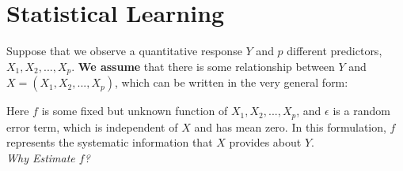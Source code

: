 \documentclass[12pt,a4paper]{article}
\begin{document}
\section{Statistical Learning}
Suppose that we observe a quantitative response $Y$ and $p$ different predictors, $X_{1},X_{2},...,X_{p}$. \textbf{We assume} that there is some relationship between $Y$ and $X =(X_{1},X_{2},...,X_{p})$, which can be written in the very general form:
\begin{center}
\end{center}
Here $f$ is some fixed but unknown function of $X_{1},X_{2},...,X_{p}$, and $\epsilon$ is a random error term, which is independent of $X$ and has mean zero. In this formulation, $f$ represents the systematic information that $X$ provides about $Y$.\\
\newline
\textit{Why Estimate $f$?}
\end{document}
